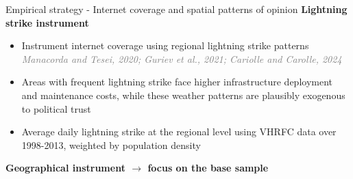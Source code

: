 \documentclass[10pt]{beamer}
\begin{document}
\begin{frame}{{\fontsize{13}{12}\selectfont
    Empirical strategy - Internet coverage and spatial patterns of opinion}}    
    \centering \textcolor{rougeprez}{\textbf{Lightning strike instrument}}
    \vspace{1.5em}
    \begin{itemize}\setlength\itemsep{1em}
\setlength\itemsep{1em}
        \item Instrument internet coverage
        using regional lightning strike patterns \textcolor{gray}{\textit{Manacorda and Tesei, 2020; Guriev
                et al., 2021; Cariolle and Carolle, 2024}}\vfill
        \item Areas with frequent lightning strike face higher infrastructure deployment and maintenance costs, while these weather patterns
                are plausibly exogenous to political trust\vfill
        \item Average daily lightning strike at the regional level using VHRFC data over 1998-2013, weighted by population density\vfill
    \end{itemize}
    \vspace{1em}

\centering \textcolor{rougeprez}{\textbf{Geographical instrument $\rightarrow$ focus on the base sample}}
\end{frame}
\end{document}
